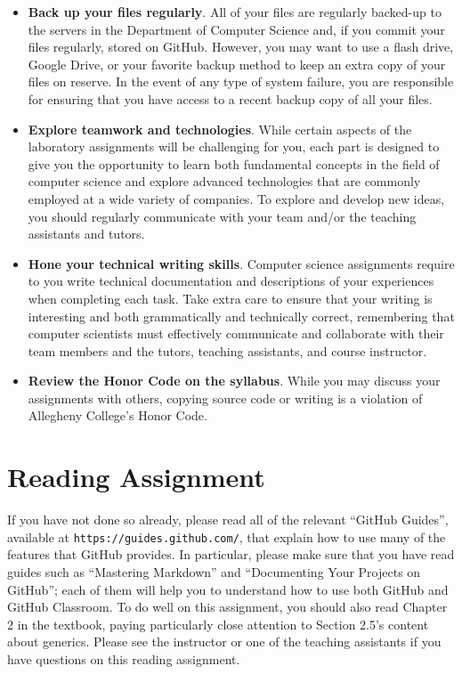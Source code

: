 \documentclass[11pt]{article}
\newcommand{\url}[1]{\lstinline{#1}}
\begin{document}
\begin{itemize}
\item {\bf Back up your files regularly}. All of your files are regularly
  backed-up to the servers in the Department of Computer Science and, if you
  commit your files regularly, stored on GitHub. However, you may want to use a
  flash drive, Google Drive, or your favorite backup method to keep an extra
  copy of your files on reserve. In the event of any type of system failure, you
  are responsible for ensuring that you have access to a recent backup copy of
  all your files.

\item {\bf Explore teamwork and technologies}. While certain aspects of the
  laboratory assignments will be challenging for you, each part is designed to
  give you the opportunity to learn both fundamental concepts in the field of
  computer science and explore advanced technologies that are commonly employed
  at a wide variety of companies. To explore and develop new ideas, you should
  regularly communicate with your team and/or the teaching assistants and
  tutors.

\item {\bf Hone your technical writing skills}. Computer science assignments
  require to you write technical documentation and descriptions of your
  experiences when completing each task. Take extra care to ensure that your
  writing is interesting and both grammatically and technically correct,
  remembering that computer scientists must effectively communicate and
  collaborate with their team members and the tutors, teaching assistants, and
  course instructor.

\item {\bf Review the Honor Code on the syllabus}. While you may discuss your
  assignments with others, copying source code or writing is a violation of
  Allegheny College's Honor Code.

\end{itemize}

\section*{Reading Assignment}

If you have not done so already, please read all of the relevant ``GitHub
Guides'', available at \url{https://guides.github.com/}, that explain how to use
many of the features that GitHub provides. In particular, please make sure that
you have read guides such as ``Mastering Markdown'' and ``Documenting Your
Projects on GitHub''; each of them will help you to understand how to use both
GitHub and GitHub Classroom. To do well on this assignment, you should also read
Chapter 2 in the textbook, paying particularly close attention to Section 2.5's
content about generics. Please see the instructor or one of the teaching
assistants if you have questions on this reading assignment.
\end{document}
